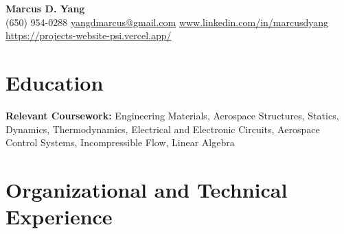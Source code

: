 \newcommand{\entrygap}{\vspace{2pt}}



\begin{center}
  {\fontsize{17}{20}\selectfont\bfseries Marcus D. Yang}\\[2pt]
  {\footnotesize (650) 954-0288 \textbar{} \href{mailto:yangdmarcus@gmail.com}{yangdmarcus@gmail.com} \textbar{} \href{https://www.linkedin.com/in/marcusdyang}{www.linkedin.com/in/marcusdyang} \textbar{} \href{https://projects-website-psi.vercel.app/}{https://projects-website-psi.vercel.app/}}
\end{center}

\section{Education}
\textbf{Relevant Coursework:} Engineering Materials, Aerospace Structures, Statics, Dynamics, Thermodynamics, Electrical and Electronic Circuits, Aerospace Control Systems, Incompressible Flow, Linear Algebra

\section{Organizational and Technical Experience}

